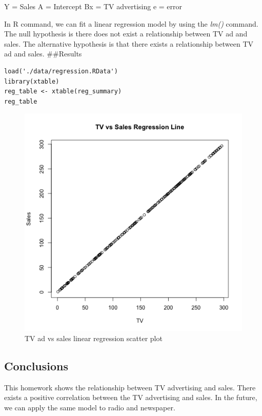 \documentclass[]{article}
\begin{document}
Y = Sales A = Intercept Bx = TV advertising e = error

In R command, we can fit a linear regression model by using the
\emph{lm()} command. The null hypothesis is there does not exist a
relationship between TV ad and sales. The alternative hypothesis is that
there exists a relationship between TV ad and sales. \#\#Results

\begin{verbatim}
load('./data/regression.RData')
library(xtable)
reg_table <- xtable(reg_summary)
reg_table
\end{verbatim}

\begin{figure}[htbp]
\centering
\includegraphics{./images/scatterplot-tv-sales.png}
\caption{TV ad vs sales linear regression scatter plot}
\end{figure}

\subsection{Conclusions}\label{conclusions}

This homework shows the relationship between TV advertising and sales.
There exists a positive correlation between the TV advertising and
sales. In the future, we can apply the same model to radio and
newspaper.
\end{document}
